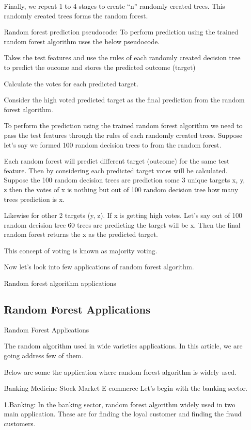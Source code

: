 \documentclass[a4paper,12pt]{article}
\begin{document}
Finally, we repeat 1 to 4 stages to create “n” randomly created trees. This randomly created trees forms the random forest.

Random forest prediction pseudocode:
To perform prediction using the trained random forest algorithm uses the below pseudocode.

Takes the test features and use the rules of each randomly created decision tree to predict the oucome and stores the predicted outcome (target)

Calculate the votes for each predicted target.

Consider the high voted predicted target as the final prediction from the random forest algorithm.

To perform the prediction using the trained random forest algorithm we need to pass the test features through the rules of each randomly created trees. Suppose let’s say we formed 100 random decision trees to from the random forest.

Each random forest will predict different target (outcome) for the same test feature. Then by considering each predicted target votes will be calculated. Suppose the 100 random decision trees are prediction some 3 unique targets x, y, z then the votes of x is nothing but out of 100 random decision tree how many trees prediction is x.

Likewise for other 2 targets (y, z). If x is getting high votes. Let’s say out of 100 random decision tree 60 trees are predicting the target will be x. Then the final random forest returns the x as the predicted target.

This concept of voting is known as majority voting.

Now let’s look into few applications of random forest algorithm.

Random forest algorithm applications
\subsection*{Random Forest Applications}
Random Forest Applications

The random algorithm used in wide varieties applications. In this article, we are going address few of them.

Below are some the application where random forest algorithm is widely used.

Banking
Medicine
Stock Market
E-commerce
Let’s begin with the banking sector.

1.Banking:
In the banking sector, random forest algorithm widely used in two main application. These are for finding the loyal customer and finding the fraud customers.
\end{document}
